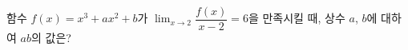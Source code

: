 함수 $f(x)=x^3+ax^2+b$가 $\displaystyle\lim_{x\to 2}\dfrac{f(x)}{x-2}=6$을 만족시킬 때, 상수 $a$, $b$에 대하여 $ab$의 값은?

